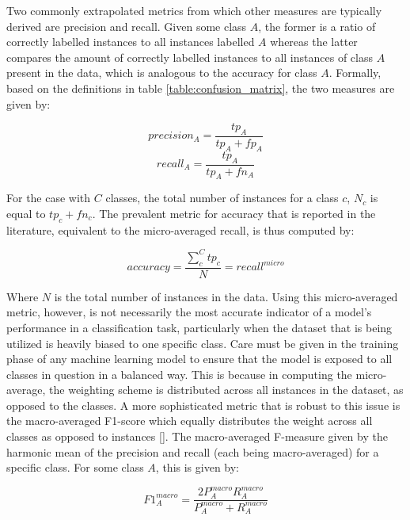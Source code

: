 \documentclass[12pt, a4paper]{report}
\theoremstyle{definition}
\theoremstyle{definition}%
\theoremstyle{definition}%
\theoremstyle{definition}%
\theoremstyle{definition}%
\theoremstyle{definition}%
\renewcommand{\cite}[1]{[\citealp{#1}]}
\begin{document}
Two commonly extrapolated metrics from which other measures are typically derived are precision and recall. Given some class $A$, the former is a ratio of correctly labelled instances to all instances labelled $A$ whereas the latter compares the amount of correctly labelled instances to all instances of class $A$ present in the data, which is analogous to the accuracy for class $A$. Formally, based on the definitions in table \ref{table:confusion_matrix}, the two measures are given by:

\begin{equation} \label{eq:precision}
	precision_A = \frac{tp_A}{tp_A + fp_A}
\end{equation}
\begin{equation} \label{eq:recall}
	recall_A = \frac{tp_A}{tp_A + fn_A}
\end{equation}

For the case with $C$ classes, the total number of instances for a class $c$, $N_c$ is equal to $tp_c + fn_c$. The prevalent metric for accuracy that is reported in the literature, equivalent to the micro-averaged recall, is thus computed by:

\begin{equation} \label{eq:accuracy}
	accuracy = \frac{\sum_{c}^{C}tp_c}{N} = recall^{micro}
\end{equation}

Where $N$ is the total number of instances in the data. Using this micro-averaged metric, however, is not necessarily the most accurate indicator of a model's performance in a classification task, particularly when the dataset that is being utilized is heavily biased to one specific class. Care must be given in the training phase of any machine learning model to ensure that the model is exposed to all classes in question in a balanced way. This is because in computing the micro-average, the weighting scheme is distributed across all instances in the dataset, as opposed to the classes. A more sophisticated metric that is robust to this issue is the macro-averaged F1-score which equally distributes the weight across all classes as opposed to instances \cite{manning2010}. The macro-averaged F-measure given by the harmonic mean of the precision and recall (each being macro-averaged) for a specific class. For some class $A$, this is given by:

\begin{equation} \label{eq:f1_measure}
	F1^{macro}_{A} = \frac{2P^{macro}_{A}R^{macro}_{A}}{P^{macro}_{A}+R^{macro}_{A}}
\end{equation}
\end{document}
